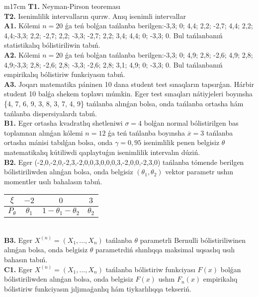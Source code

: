 \documentclass{article}
\begin{document}
\begin{tabular}{m{17cm}}
\textbf{T1.} 
Neyman-Pirson teoreması
 \\
\textbf{T2.} 
Isenimlilik intervalların qurıw. Anıq isenimli intervallar
 \\
\textbf{A1.} 
Kólemi \(n = 20\) ǵa teń bolǵan tańlanba berilgen:-3,3; 0; 4,4; 2,2; -2,7; 4,4; 2,2; 4,4;-3,3; 2,2; -2,7; 2,2; -3,3; -2,7; 2,2; 3,4; 4,4; 0; -3,3; 0. Bul tańlanbanıń statistikalıq bólistiriliwin tabıń.
 \\
\textbf{A2.} 
Kólemi \(n = 20\) ǵa teń bolǵan tańlanba berilgen:-3,3; 0; 4,9; 2,8; -2,6; 4,9; 2,8; 4,9;-3,3; 2,8; -2,6; 2,8; -3,3; -2,6; 2,8; 3,1; 4,9; 0; -3,3; 0. Bul tańlanbanıń empirikalıq bólistiriw funkciyasın tabıń.
 \\
\textbf{A3.} 
Joqarı matematika páninen 10 dana student test sınaqların tapsırǵan. Hárbir student 10 balǵa shekem toplawı múmkin. Eger test sınaqları nátiyjeleri boyınsha \{4, 7, 6, 9, 3, 8, 3, 7, 4, 9\} tańlanba alınǵan bolsa, onda tańlanba ortasha hám tańlanba dispersiyalardı tabıń.
 \\
\textbf{B1.} 
Eger ortasha kvadratlıq shetleniwi \(\sigma = 4\) bolǵan normal bólistirilgen bas toplamnan alınǵan kólemi \(n = 12\) ǵa teń tańlanba boyınsha \(\overline{x} = 3\) tańlanba ortasha mánisi tabılǵan bolsa, onda \(\gamma = 0,95\) isenimlilik penen belgisiz \(\theta\) matematikalıq kútiliwdi qaplaytuǵın isenimlilik intervalın dúziń.
 \\
\textbf{B2.} 
Eger (-2,0,-2,0,-2,3,-2,0,0,3,0,0,0,3,-2,0,0,-2,3,0) tańlanba tómende berilgen bólistiriliwden alınǵan bolsa, onda belgisiz \(\left( \theta_{1},\theta_{2} \right)\) vektor parametr ushın momentler usılı bahalasın tabıń.
\begin{tabular}{|c|c|c|c|}
  \hline
$\xi$ &
$- 2$ &
$0$ &
$3$\\
\hline
\(P_{\theta}\) & \(\theta_{1}\) & \(1 - \theta_{1} - \theta_{2}\) & \(\theta_{2}\) \\
\hline
\end{tabular}
 \\
\textbf{B3.} 
Eger \(X^{(n)} = \left( X_{1},...,X_{n} \right)\) tańlanba \(\theta\) parametrli Bernulli bólistiriliwinen alınǵan bolsa, onda belgisiz \(\theta\) parametrdiń shınlıqqa maksimal uqsaslıq usılı bahasın tabıń.
 \\
\textbf{C1.} 
Eger \(X^{(n)} = \left( X_{1},...,X_{n} \right)\) tańlanba bólistiriw funkciyası \(F(x)\) bolǵan bólistiriliwden alınǵan bolsa, onda belgisiz \(F(x)\) ushın \(F_{n}(x)\) empirikalıq bólistiriw funkciyasın jıljımaǵanlıq hám tiykarlılıqqa tekseriń.
 \\

\end{tabular}
\end{document}
